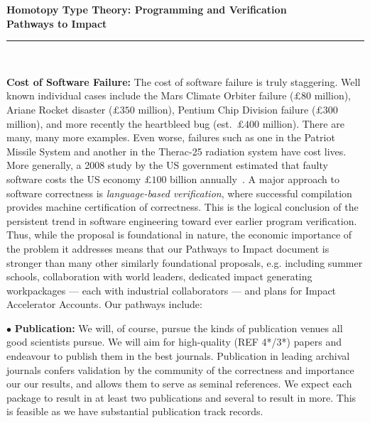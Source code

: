 \documentclass[a4paper,11pt]{article}
\begin{document}
\thispagestyle{plain}

\begin{center}

  {\Large {\bf Homotopy Type Theory: Programming and Verification \\
\vspace{0.2in} 
Pathways to Impact}}\\[1ex]   



\vspace*{-0.1in}



  \rule{150mm}{.5mm}\\[2ex]

\end{center}



\noindent



\vspace*{-0.1in}

{\bf Cost of Software Failure:} The cost of software failure is truly
staggering. Well known individual cases include the Mars Climate
Orbiter failure ($\pounds 80$ million), Ariane Rocket disaster
($\pounds 350$ million), Pentium Chip Division failure ($\pounds 300$
million), and more recently the heartbleed bug (est.\ $\pounds 400$
million).  There are many, many more examples. Even worse, 
failures such as one in the Patriot Missile System and
another in the Therac-25 radiation system have cost lives. More
generally, a 2008 study by the US government estimated that faulty
software costs the US economy $\pounds 100$ billion
annually~\cite{cnet08}.  A
major approach to software correctness is {\em language-based
  verification}, where successful compilation provides machine
certification of correctness. This is the logical conclusion of the
persistent trend in software engineering toward ever earlier program
verification. Thus, while the proposal is foundational in nature, the
economic importance of the problem it addresses means that our
Pathways to Impact document is stronger than many other similarly
foundational proposals, e.g. including summer schools, collaboration
with world leaders, dedicated impact generating workpackages --- each
with industrial collaborators --- and plans for Impact Accelerator
Accounts. Our pathways include:

\vspace*{0.02in}

$\bullet$ {\bf Publication:} We will, of course, pursue the kinds of
publication venues all good scientists pursue. We will
aim for high-quality (REF 4*/3*) papers and endeavour to publish them in the best
journals. Publication in leading archival journals 
confers validation by the community of the correctness and importance
our our results, and allows them to serve as seminal references.
We expect each package to result in at least two
publications and several to result in more. This is feasible as we
have substantial publication track records.
\end{document}
